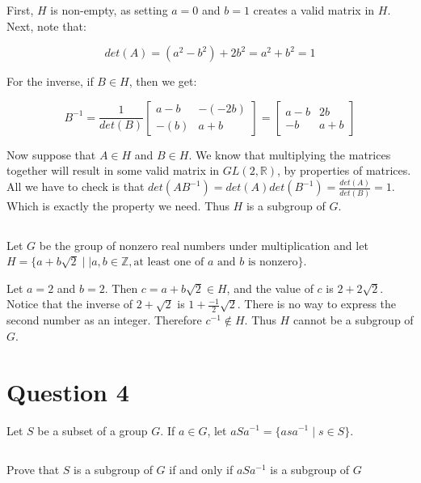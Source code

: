 \documentclass[a4paper,12pt]{article}
\begin{document}
First, $H$ is non-empty, as setting $a = 0$ and $b = 1$ creates a valid matrix in $H$. Next, note that:

\begin{equation*}
det(A) = (a^2 - b^2) + 2b^2 = a^2 + b^2 = 1
\end{equation*}

For the inverse, if $B \in H$, then we get:

\begin{equation*}
B^{-1} = \frac{1}{det(B)} \left[\begin{array}{cc}
a - b 	&		-(-2b) \\
 -(b)			&		a+b
\end{array}
\right] = \left[ \begin{array}{cc}
a - b 	&		2b \\
 -b			&		a+b
\end{array} \right]
\end{equation*}

Now suppose that $A \in H$ and $B \in H$. We know that multiplying the matrices together will result in some valid matrix in $GL(2, \mathbb{R})$, by properties of matrices. All we have to check is that $det(AB^{-1}) = det(A)det(B^{-1}) = \frac{det(A)}{det(B)} = 1$. Which is exactly the property we need. Thus $H$ is a subgroup of $G$.

\subsection{}

Let $G$ be the group of nonzero real numbers under multiplication and let $H = \{a+b\sqrt{2} \mid| a,b\in \mathbb{Z}, \text{at least one of $a$ and $b$ is nonzero}\}$.

Let $a = 2$ and $b = 2$. Then $c = a + b\sqrt{2} \in H$, and the value of $c$ is $2 + 2\sqrt{2}$. Notice that the inverse of $2 + \sqrt{2}$ is $1 + \frac{-1}{2} \sqrt{2}$. There is no way to express the second number as an integer. Therefore $c^{-1} \notin H$. Thus $H$ cannot be a subgroup of $G$.

\section{Question 4}
Let $S$ be a subset of a group $G$. If $a \in G$, let $aSa^{-1} = \{ asa^{-1} \mid s \in S \}$.

\subsection{}
Prove that $S$ is a subgroup of $G$ if and only if $aSa^{-1}$ is a subgroup of $G$
\end{document}
